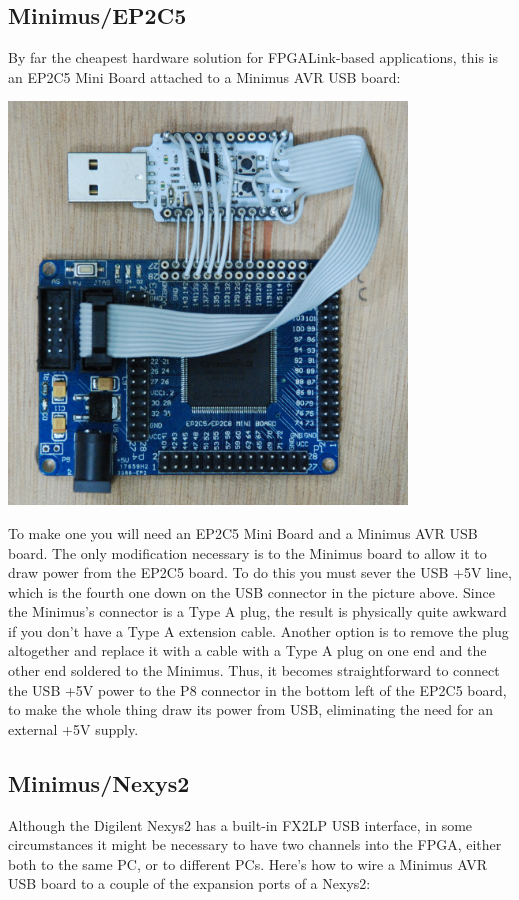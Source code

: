 \subsection{Minimus/EP2C5}
By far the cheapest hardware solution for FPGALink-based applications, this is an EP2C5 Mini Board attached to a Minimus AVR USB board:

\vspace*{0.5cm}
\centerline{\includegraphics[width=300pt]{images/ep2c5}}

To make one you will need an EP2C5 Mini Board and a Minimus AVR USB board. The only modification necessary is to the Minimus board to allow it to draw power from the EP2C5 board. To do this you must sever the USB +5V line, which is the fourth one down on the USB connector in the picture above. Since the Minimus's connector is a Type A plug, the result is physically quite awkward if you don't have a Type A extension cable. Another option is to remove the plug altogether and replace it with a cable with a Type A plug on one end and the other end soldered to the Minimus. Thus, it becomes straightforward to connect the USB +5V power to the P8 connector in the bottom left of the EP2C5 board, to make the whole thing draw its power from USB, eliminating the need for an external +5V supply.

\subsection{Minimus/Nexys2}
Although the Digilent Nexys2 has a built-in FX2LP USB interface, in some circumstances it might be necessary to have two channels into the FPGA, either both to the same PC, or to different PCs. Here's how to wire a Minimus AVR USB board to a couple of the expansion ports of a Nexys2:

